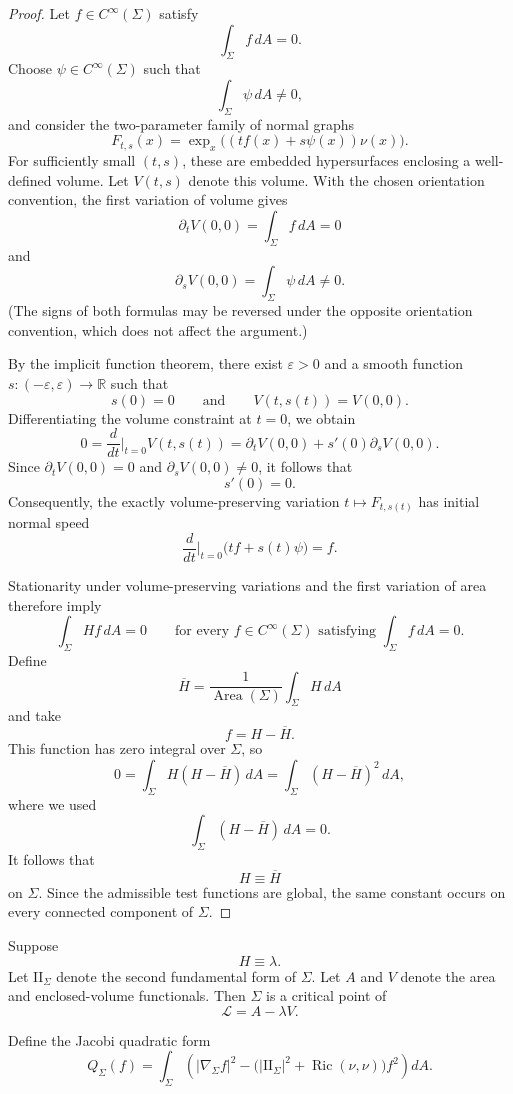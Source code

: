 \documentclass[11pt,reqno]{amsart}
\numberwithin{equation}{section}
\theoremstyle{definition}
\theoremstyle{remark}
\newcommand{\Ric}{\operatorname{Ric}}
\begin{document}
\begin{proof}
Let \(f\in C^\infty(\Sigma)\) satisfy
\[
\int_\Sigma f\,dA=0.
\]
Choose \(\psi\in C^\infty(\Sigma)\) such that
\[
\int_\Sigma \psi\,dA\neq 0,
\]
and consider the two-parameter family of normal graphs
\[
F_{t,s}(x)
=
\exp_x\bigl((tf(x)+s\psi(x))\nu(x)\bigr).
\]
For sufficiently small \((t,s)\), these are embedded hypersurfaces
enclosing a well-defined volume. Let \(V(t,s)\) denote this volume.
With the chosen orientation convention, the first variation of volume
gives
\[
\partial_tV(0,0)=\int_\Sigma f\,dA=0
\]
and
\[
\partial_sV(0,0)=\int_\Sigma\psi\,dA\neq 0.
\]
(The signs of both formulas may be reversed under the opposite
orientation convention, which does not affect the argument.)

By the implicit function theorem, there exist \(\varepsilon>0\) and a
smooth function \(s:(-\varepsilon,\varepsilon)\to\mathbb{R}\) such that
\[
s(0)=0
\qquad\text{and}\qquad
V(t,s(t))=V(0,0).
\]
Differentiating the volume constraint at \(t=0\), we obtain
\[
0
=
\frac{d}{dt}\bigg|_{t=0}V(t,s(t))
=
\partial_tV(0,0)+s'(0)\partial_sV(0,0).
\]
Since \(\partial_tV(0,0)=0\) and \(\partial_sV(0,0)\neq 0\), it follows
that
\[
s'(0)=0.
\]
Consequently, the exactly volume-preserving variation
\(t\mapsto F_{t,s(t)}\) has initial normal speed
\[
\frac{d}{dt}\bigg|_{t=0}\bigl(tf+s(t)\psi\bigr)=f.
\]

Stationarity under volume-preserving variations and the first variation
of area therefore imply
\[
\int_\Sigma Hf\,dA=0
\qquad
\text{for every } f\in C^\infty(\Sigma)
\text{ satisfying }
\int_\Sigma f\,dA=0.
\]
Define
\[
\overline H
=
\frac{1}{\operatorname{Area}(\Sigma)}
\int_\Sigma H\,dA
\]
and take
\[
f=H-\overline H.
\]
This function has zero integral over \(\Sigma\), so
\[
0
=
\int_\Sigma H(H-\overline H)\,dA
=
\int_\Sigma (H-\overline H)^2\,dA,
\]
where we used
\[
\int_\Sigma(H-\overline H)\,dA=0.
\]
It follows that
\[
H\equiv \overline H
\]
on \(\Sigma\). Since the admissible test functions are global, the same
constant occurs on every connected component of \(\Sigma\).
\end{proof}

Suppose
\[
H\equiv\lambda.
\]
Let \(\mathrm{II}_\Sigma\) denote the second fundamental form of \(\Sigma\).
Let \(A\) and \(V\) denote the area and enclosed-volume functionals. Then
\(\Sigma\) is a critical point of
\[
\mathcal L=A-\lambda V.
\]

Define the Jacobi quadratic form
\[
Q_\Sigma(f)
=
\int_\Sigma
\left(
|\nabla_\Sigma f|^2
-
\bigl(
|\mathrm{II}_\Sigma|^2+\Ric(\nu,\nu)
\bigr)f^2
\right)dA.
\]
\end{document}
